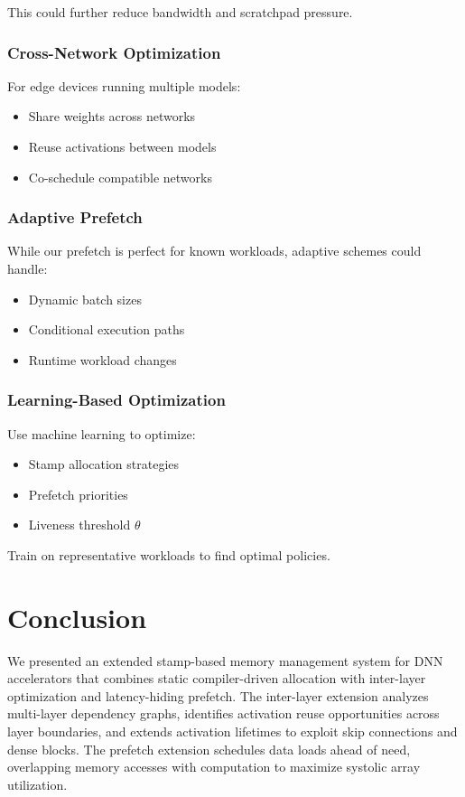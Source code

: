 \documentclass[journal]{IEEEtran}
\begin{document}
This could further reduce bandwidth and scratchpad pressure.

\subsubsection{Cross-Network Optimization}
For edge devices running multiple models:
\begin{itemize}
\item Share weights across networks
\item Reuse activations between models
\item Co-schedule compatible networks
\end{itemize}

\subsubsection{Adaptive Prefetch}
While our prefetch is perfect for known workloads, adaptive schemes could handle:
\begin{itemize}
\item Dynamic batch sizes
\item Conditional execution paths
\item Runtime workload changes
\end{itemize}

\subsubsection{Learning-Based Optimization}
Use machine learning to optimize:
\begin{itemize}
\item Stamp allocation strategies
\item Prefetch priorities
\item Liveness threshold $\theta$
\end{itemize}

Train on representative workloads to find optimal policies.

\section{Conclusion}

We presented an extended stamp-based memory management system for DNN accelerators that combines static compiler-driven allocation with inter-layer optimization and latency-hiding prefetch. The inter-layer extension analyzes multi-layer dependency graphs, identifies activation reuse opportunities across layer boundaries, and extends activation lifetimes to exploit skip connections and dense blocks. The prefetch extension schedules data loads ahead of need, overlapping memory accesses with computation to maximize systolic array utilization.
\end{document}
